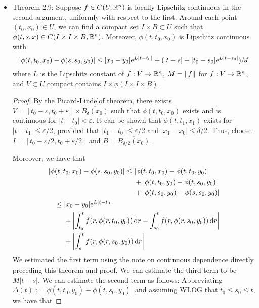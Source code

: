 \documentclass[../notes.tex]{subfiles}
\begin{document}
\begin{itemize}
    \item Theorem 2.9: Suppose $f\in C(U,\R^n)$ is locally Lipschitz continuous in the second argument, uniformly with respect to the first. Around each point $(t_0,x_0)\in U$, we can find a compact set $I\times B\subset U$ such that $\phi(t,s,x)\in C(I\times I\times B,\R^n)$. Moreover, $\phi(t,t_0,x_0)$ is Lipschitz continuous with
    \begin{equation*}
        |\phi(t,t_0,x_0)-\phi(s,s_0,y_0)| \leq |x_0-y_0|\e[L|t-t_0|]+(|t-s|+|t_0-s_0|\e[L|t-s_0|])M
    \end{equation*}
    where $L$ is the Lipschitz constant of $f:V\to\R^n$, $M=\norm{f}$ for $f:V\to\R^n$, and $V\subset U$ compact contains $I\times\phi(I\times I\times B)$.
    \begin{proof}
        By the Picard-Lindel\"{o}f theorem, there exists $V=[t_0-\varepsilon,t_0+\varepsilon]\times\overline{B_\delta(x_0)}$ such that $\phi(t,t_0,x_0)$ exists and is continuous for $|t-t_0|<\varepsilon$. It can be shown that $\phi(t,t_1,x_1)$ exists for $|t-t_1|\leq\varepsilon/2$, provided that $|t_1-t_0|\leq\varepsilon/2$ and $|x_1-x_0|\leq\delta/2$. Thus, choose $I=[t_0-\varepsilon/2,t_0+\varepsilon/2]$ and $B=\overline{B_{\delta/2}(x_0)}$.\par
        Moreover, we have that
        \begin{align*}
            \begin{split}
                |\phi(t,t_0,x_0)-\phi(s,s_0,y_0)| \leq{}& |\phi(t,t_0,x_0)-\phi(t,t_0,y_0)|\\
                &+|\phi(t,t_0,y_0)-\phi(t,s_0,y_0)|\\
                &+|\phi(t,s_0,y_0)-\phi(s,s_0,y_0)|
            \end{split}\\
            \begin{split}
                \leq{}& |x_0-y_0|\e[L|t-t_0|]\\
                &+\left| \int_{t_0}^tf(r,\phi(r,t_0,y_0))\dd{r}-\int_{s_0}^tf(r,\phi(r,s_0,y_0))\dd{r} \right|\\
                &+\left| \int_s^tf(r,\phi(r,s_0,y_0))\dd{r} \right|
            \end{split}
        \end{align*}
        We estimated the first term using the note on continuous dependence directly preceding this theorem and proof. We can estimate the third term to be $M|t-s|$. We can estimate the second term as follows: Abbreviating $\Delta(t):=|\phi(t,t_0,y_0)-\phi(t,s_0,y_0)|$ and assuming WLOG that $t_0\leq s_0\leq t$, we have that

\end{proof}
\end{itemize}
\end{document}
